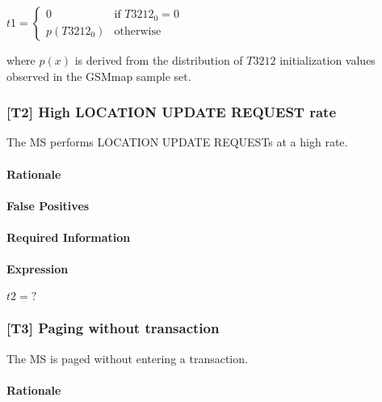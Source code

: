 \documentclass[a4paper,11pt,notitlepage,bigheadings,oneside]{scrartcl}
\begin{document}
$t1 =
\begin{cases}
	0 	 	& \text{if } T3212_0 = 0 \\
	p(T3212_0) 	& \text{otherwise}
\end{cases}$

where $p(x)$ is derived from the distribution of $T3212$ initialization values
observed in the GSMmap sample set.


\subsubsection{[T2] High LOCATION UPDATE REQUEST rate}

The MS performs LOCATION UPDATE REQUESTs at a high rate.

\paragraph{Rationale}


\paragraph{False Positives}


\paragraph{Required Information}


\paragraph{Expression}

$t2 = ?$

\subsubsection{[T3] Paging without transaction}

The MS is paged without entering a transaction.

\paragraph{Rationale}
\end{document}
